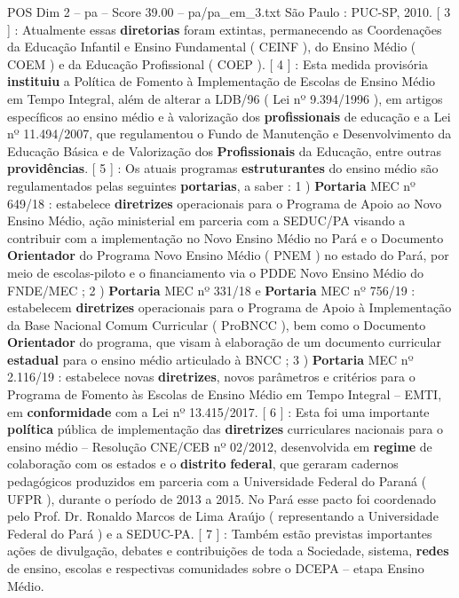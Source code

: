 \begin{textsample}{POS Dim 2 – pa – Score 39.00 – pa/pa\_em\_3.txt}
São Paulo : PUC-SP, 2010. [ 3 ] : Atualmente essas \textbf{diretorias} foram extintas, permanecendo as Coordenações da Educação Infantil e Ensino Fundamental ( CEINF ), do Ensino Médio ( COEM ) e da Educação Profissional ( COEP ). [ 4 ] : Esta medida provisória \textbf{instituiu} a Política de Fomento à Implementação de Escolas de Ensino Médio em Tempo Integral, além de alterar a LDB/96 ( Lei nº 9.394/1996 ), em artigos específicos ao ensino médio e à valorização dos \textbf{profissionais} de educação e a Lei nº 11.494/2007, que regulamentou o Fundo de Manutenção e Desenvolvimento da Educação Básica e de Valorização dos \textbf{Profissionais} da Educação, entre outras \textbf{providências}. [ 5 ] : Os atuais programas \textbf{estruturantes} do ensino médio são regulamentados pelas seguintes \textbf{portarias}, a saber : 1 ) \textbf{Portaria} MEC nº 649/18 : estabelece \textbf{diretrizes} operacionais para o Programa de Apoio ao Novo Ensino Médio, ação ministerial em parceria com a SEDUC/PA visando a contribuir com a implementação no Novo Ensino Médio no Pará e o Documento \textbf{Orientador} do Programa Novo Ensino Médio ( PNEM ) no estado do Pará, por meio de escolas-piloto e o financiamento via o PDDE Novo Ensino Médio do FNDE/MEC ; 2 ) \textbf{Portaria} MEC nº 331/18 e \textbf{Portaria} MEC nº 756/19 : estabelecem \textbf{diretrizes} operacionais para o Programa de Apoio à Implementação da Base Nacional Comum Curricular ( ProBNCC ), bem como o Documento \textbf{Orientador} do programa, que visam à elaboração de um documento curricular \textbf{estadual} para o ensino médio articulado à BNCC ; 3 ) \textbf{Portaria} MEC nº 2.116/19 : estabelece novas \textbf{diretrizes}, novos parâmetros e critérios para o Programa de Fomento às Escolas de Ensino Médio em Tempo Integral – EMTI, em \textbf{conformidade} com a Lei nº 13.415/2017. [ 6 ] : Esta foi uma importante \textbf{política} pública de implementação das \textbf{diretrizes} curriculares nacionais para o ensino médio – Resolução CNE/CEB nº 02/2012, desenvolvida em \textbf{regime} de colaboração com os estados e o \textbf{distrito} \textbf{federal}, que geraram cadernos pedagógicos produzidos em parceria com a Universidade Federal do Paraná ( UFPR ), durante o período de 2013 a 2015.
No Pará esse pacto foi coordenado pelo Prof.
Dr.
Ronaldo Marcos de Lima Araújo ( representando a Universidade Federal do Pará ) e a SEDUC-PA. [ 7 ] : Também estão previstas importantes ações de divulgação, debates e contribuições de toda a Sociedade, sistema, \textbf{redes} de ensino, escolas e respectivas comunidades sobre o DCEPA – etapa Ensino Médio.

\end{textsample}
